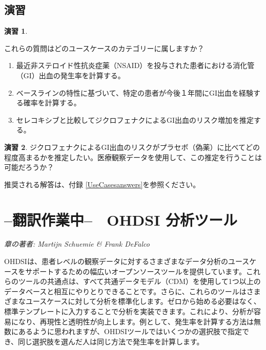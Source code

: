 \documentclass[
  11pt]{book}
\theoremstyle{definition}
\theoremstyle{definition}
\theoremstyle{definition}
\newtheorem{exercise}{演習}[chapter]
\theoremstyle{definition}
\theoremstyle{remark}
\begin{document}
\section{演習}\label{ux6f14ux7fd2-3}

\begin{exercise}
\protect\hypertarget{exr:exerciseUseCases1}{}\label{exr:exerciseUseCases1}

これらの質問はどのユースケースのカテゴリーに属しますか？

\begin{enumerate}
\def\labelenumi{\arabic{enumi}.}
\item
  最近非ステロイド性抗炎症薬（NSAID）を投与された患者における消化管（GI）出血の発生率を計算する。
\item
  ベースラインの特性に基づいて、特定の患者が今後１年間にGI出血を経験する確率を計算する。
\item
  セレコキシブと比較してジクロフェナクによるGI出血のリスク増加を推定する。
\end{enumerate}

\end{exercise}

\begin{exercise}
\protect\hypertarget{exr:exerciseUseCases2}{}\label{exr:exerciseUseCases2}ジクロフェナクによるGI出血のリスクがプラセボ（偽薬）に比べてどの程度高まるかを推定したい。医療観察データを使用して、この推定を行うことは可能だろうか？
\end{exercise}

推奨される解答は、付録 \ref{UseCasesanswers}を参照ください。

\chapter{--翻訳作業中--　OHDSI 分析ツール}\label{OhdsiAnalyticsTools}

\emph{章の著者: Martijn Schuemie \& Frank DeFalco}

OHDSIは、患者レベルの観察データに対するさまざまなデータ分析のユースケースをサポートするための幅広いオープンソースツールを提供しています。これらのツールの共通点は、すべて共通データモデル（CDM）を使用して1つ以上のデータベースと相互にやりとりできることです。さらに、これらのツールはさまざまなユースケースに対して分析を標準化します。ゼロから始める必要はなく、標準テンプレートに入力することで分析を実装できます。これにより、分析が容易になり、再現性と透明性が向上します。例として、発生率を計算する方法は無数にあるように思われますが、OHDSIツールではいくつかの選択肢で指定でき、同じ選択肢を選んだ人は同じ方法で発生率を計算します。
\end{document}
